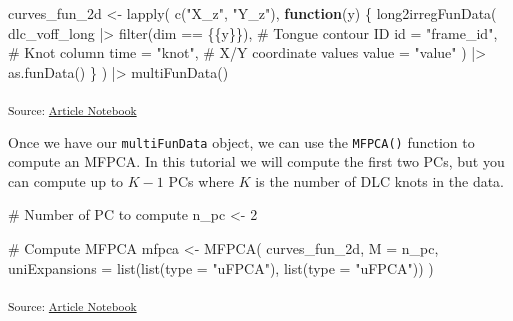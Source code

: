 \documentclass[
  man,
  longtable,
  nolmodern,
  notxfonts,
  notimes,
  colorlinks=true,linkcolor=blue,citecolor=blue,urlcolor=blue]{apa7}
\newenvironment{Shaded}{\begin{snugshade}}{\end{snugshade}}
\newcommand{\AttributeTok}[1]{\textcolor[rgb]{0.40,0.45,0.13}{#1}}
\newcommand{\CommentTok}[1]{\textcolor[rgb]{0.37,0.37,0.37}{#1}}
\newcommand{\ControlFlowTok}[1]{\textcolor[rgb]{0.00,0.23,0.31}{\textbf{#1}}}
\newcommand{\DecValTok}[1]{\textcolor[rgb]{0.68,0.00,0.00}{#1}}
\newcommand{\FunctionTok}[1]{\textcolor[rgb]{0.28,0.35,0.67}{#1}}
\newcommand{\NormalTok}[1]{\textcolor[rgb]{0.00,0.23,0.31}{#1}}
\newcommand{\OtherTok}[1]{\textcolor[rgb]{0.00,0.23,0.31}{#1}}
\newcommand{\SpecialCharTok}[1]{\textcolor[rgb]{0.37,0.37,0.37}{#1}}
\newcommand{\StringTok}[1]{\textcolor[rgb]{0.13,0.47,0.30}{#1}}
\begin{document}
\begin{Shaded}
\begin{Highlighting}[]
\NormalTok{curves\_fun\_2d }\OtherTok{\textless{}{-}} \FunctionTok{lapply}\NormalTok{(}
  \FunctionTok{c}\NormalTok{(}\StringTok{"X\_z"}\NormalTok{, }\StringTok{"Y\_z"}\NormalTok{),}
  \ControlFlowTok{function}\NormalTok{(y) \{}
    \FunctionTok{long2irregFunData}\NormalTok{(}
\NormalTok{      dlc\_voff\_long }\SpecialCharTok{|\textgreater{}} \FunctionTok{filter}\NormalTok{(dim }\SpecialCharTok{==}\NormalTok{ \{\{y\}\}),}
      \CommentTok{\# Tongue contour ID}
      \AttributeTok{id =} \StringTok{"frame\_id"}\NormalTok{,}
      \CommentTok{\# Knot column}
      \AttributeTok{time =} \StringTok{"knot"}\NormalTok{,}
      \CommentTok{\# X/Y coordinate values}
      \AttributeTok{value =} \StringTok{"value"}
\NormalTok{    ) }\SpecialCharTok{|\textgreater{}} 
    \FunctionTok{as.funData}\NormalTok{()}
\NormalTok{  \}}
\NormalTok{) }\SpecialCharTok{|\textgreater{}} 
  \FunctionTok{multiFunData}\NormalTok{()}
\end{Highlighting}
\end{Shaded}

\textsubscript{Source:
\href{https://stefanocoretta.github.io/mv_uti/index.qmd.html}{Article
Notebook}}

Once we have our \texttt{multiFunData} object, we can use the
\texttt{MFPCA()} function to compute an MFPCA. In this tutorial we will
compute the first two PCs, but you can compute up to \(K-1\) PCs where
\(K\) is the number of DLC knots in the data.

\begin{Shaded}
\begin{Highlighting}[]
\CommentTok{\# Number of PC to compute}
\NormalTok{n\_pc }\OtherTok{\textless{}{-}} \DecValTok{2}

\CommentTok{\# Compute MFPCA}
\NormalTok{mfpca }\OtherTok{\textless{}{-}} \FunctionTok{MFPCA}\NormalTok{(}
\NormalTok{  curves\_fun\_2d,}
  \AttributeTok{M =}\NormalTok{ n\_pc,}
  \AttributeTok{uniExpansions =} \FunctionTok{list}\NormalTok{(}\FunctionTok{list}\NormalTok{(}\AttributeTok{type =} \StringTok{"uFPCA"}\NormalTok{), }\FunctionTok{list}\NormalTok{(}\AttributeTok{type =} \StringTok{"uFPCA"}\NormalTok{))}
\NormalTok{)}
\end{Highlighting}
\end{Shaded}

\textsubscript{Source:
\href{https://stefanocoretta.github.io/mv_uti/index.qmd.html}{Article
Notebook}}
\end{document}
